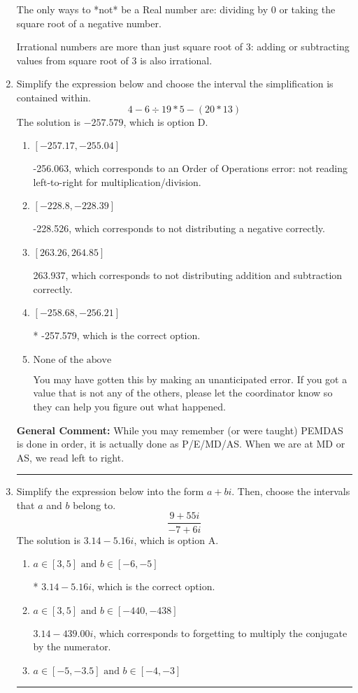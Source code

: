 \documentclass{extbook}[14pt]
\newcommand{\litem}[1]{\item #1

\rule{\textwidth}{0.4pt}}
\begin{document}
\begin{enumerate}
{ The only ways to *not* be a Real number are: dividing by 0 or taking the square root of a negative number. 
 
 Irrational numbers are more than just square root of 3: adding or subtracting values from square root of 3 is also irrational.
}
\litem{
Simplify the expression below and choose the interval the simplification is contained within.
\[ 4 - 6 \div 19 * 5 - (20 * 13) \]The solution is \( -257.579 \), which is option D.\begin{enumerate}[label=\Alph*.]
\item \( [-257.17, -255.04] \)

 -256.063, which corresponds to an Order of Operations error: not reading left-to-right for multiplication/division.
\item \( [-228.8, -228.39] \)

 -228.526, which corresponds to not distributing a negative correctly.
\item \( [263.26, 264.85] \)

 263.937, which corresponds to not distributing addition and subtraction correctly.
\item \( [-258.68, -256.21] \)

* -257.579, which is the correct option.
\item \( \text{None of the above} \)

 You may have gotten this by making an unanticipated error. If you got a value that is not any of the others, please let the coordinator know so they can help you figure out what happened.
\end{enumerate}

\textbf{General Comment:} While you may remember (or were taught) PEMDAS is done in order, it is actually done as P/E/MD/AS. When we are at MD or AS, we read left to right.
}
\litem{
Simplify the expression below into the form $a+bi$. Then, choose the intervals that $a$ and $b$ belong to.
\[ \frac{9 + 55 i}{-7 + 6 i} \]The solution is \( 3.14  - 5.16 i \), which is option A.\begin{enumerate}[label=\Alph*.]
\item \( a \in [3, 5] \text{ and } b \in [-6, -5] \)

* $3.14  - 5.16 i$, which is the correct option.
\item \( a \in [3, 5] \text{ and } b \in [-440, -438] \)

 $3.14  - 439.00 i$, which corresponds to forgetting to multiply the conjugate by the numerator.
\item \( a \in [-5, -3.5] \text{ and } b \in [-4, -3] \)


\end{enumerate}}
\end{enumerate}
\end{document}
